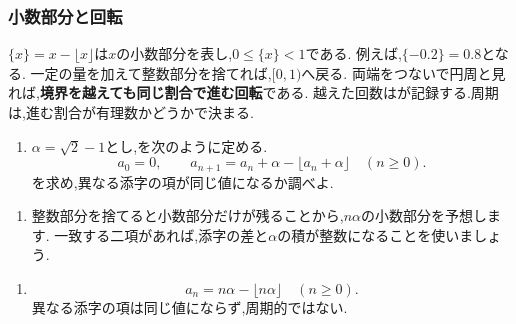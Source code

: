 \subsubsection{小数部分と回転}\label{節：小数部分と回転}
$\{x\}=x-\lfloor x\rfloor$は$x$の小数部分を表し,$0\le\{x\}<1$である.
例えば,$\{-0.2\}=0.8$となる.
一定の量を加えて整数部分を捨てれば,$[0,1)$へ戻る.
両端をつないで円周と見れば,\textbf{境界を越えても同じ割合で進む回転}である.
越えた回数はが記録する.周期は,進む割合が有理数かどうかで決まる.

\noindent {}\par\nobreak
\begin{enumerate}[label=(\arabic*),parsep=3pt,beginpenalty=10000,format=\bookitemlink{example-gauss-role-9}{problem}{answer}]
  \item $\alpha=\sqrt2-1$とし,を次のように定める.
    \[
      a_0=0,\qquad
      a_{n+1}=a_n+\alpha-\lfloor a_n+\alpha\rfloor
      \quad(n\ge0).
    \]
    を求め,異なる添字の項が同じ値になるか調べよ.
\end{enumerate}

\noindent {}\par\nobreak
\begin{enumerate}[label=(\arabic*),parsep=3pt,beginpenalty=10000,format=\bookitemlink{example-gauss-role-9}{hint}{problem}]
  \item 整数部分を捨てると小数部分だけが残ることから,$n\alpha$の小数部分を予想します.
    一致する二項があれば,添字の差と$\alpha$の積が整数になることを使いましょう.
\end{enumerate}

\noindent {}\par\nobreak
\begin{enumerate}[label=(\arabic*),parsep=3pt,beginpenalty=10000,format=\bookitemlink{example-gauss-role-9}{answer}{problem}]
  \item \[
      a_n=n\alpha-\lfloor n\alpha\rfloor\quad(n\ge0).
    \]
    異なる添字の項は同じ値にならず,周期的ではない.
\end{enumerate}


